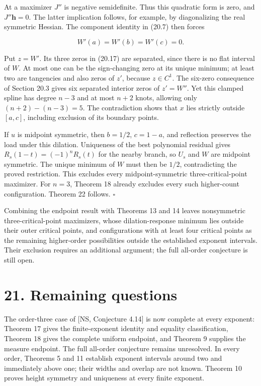 \documentclass[11pt]{article}
\begin{document}
At a maximizer \(J''\) is negative semidefinite. Thus this quadratic
form is zero, and \(J''\mathbf h=0\). The latter implication follows,
for example, by diagonalizing the real symmetric Hessian. The component
identity in (20.7) then forces

\[
W'(a)=W'(b)=W'(c)=0.
\tag{20.17}
\]

Put \(z=W'\). Its three zeros in (20.17) are separated, since there is
no flat interval of \(W\). At most one can be the sign-changing zero at
its unique minimum; at least two are tangencies and also zeros of
\(z'\), because \(z\in C^1\). The six-zero consequence of Section 20.3
gives six separated interior zeros of \(z'=W''\). Yet this clamped
spline has degree \(n-3\) and at most \(n+2\) knots, allowing only
\((n+2)-(n-3)=5\). The contradiction shows that \(x\) lies strictly
outside \([a,c]\), including exclusion of its boundary points.

If \(u\) is midpoint symmetric, then \(b=1/2\), \(c=1-a\), and
reflection preserves the load under this dilation. Uniqueness of the
best polynomial residual gives \(R_s(1-t)=(-1)^nR_s(t)\) for the nearby
branch, so \(U_s\) and \(W\) are midpoint symmetric. The unique minimum
of \(W\) must then be \(1/2\), contradicting the proved restriction.
This excludes every midpoint-symmetric three-critical-point maximizer.
For \(n=3\), Theorem 18 already excludes every such higher-count
configuration. Theorem 22 follows. \(\square\)

Combining the endpoint result with Theorems 13 and 14 leaves
nonsymmetric three-critical-point maximizers, whose dilation-response
minimum lies outside their outer critical points, and configurations
with at least four critical points as the remaining higher-order
possibilities outside the established exponent intervals. Their
exclusion requires an additional argument; the full all-order conjecture
is still open.

\section{21. Remaining questions}\label{remaining-questions}

The order-three case of {[}NS, Conjecture 4.14{]} is now complete at
every exponent: Theorem 17 gives the finite-exponent identity and
equality classification, Theorem 18 gives the complete uniform endpoint,
and Theorem 9 supplies the measure endpoint. The full all-order
conjecture remains unresolved. In every order, Theorems 5 and 11
establish exponent intervals around two and immediately above one; their
widths and overlap are not known. Theorem 10 proves height symmetry and
uniqueness at every finite exponent.
\end{document}
